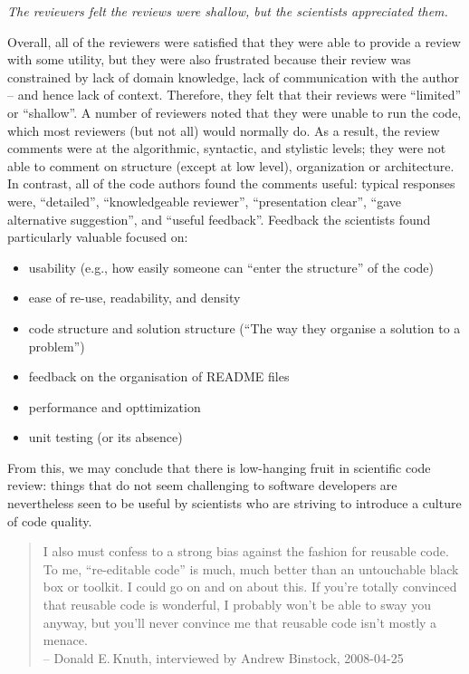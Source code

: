 \noindent
\emph{The reviewers felt the reviews were shallow, but the scientists appreciated them.}

Overall, all of the reviewers were satisfied that they were able to provide a review with some utility, but they were also frustrated because their review was constrained by lack of domain knowledge, lack of communication with the author – and hence lack of context. Therefore, they felt that their reviews were ``limited'' or ``shallow''. A number of reviewers noted that they were unable to run the code, which most reviewers (but not all) would normally do. As a result, the review comments were at the algorithmic, syntactic, and stylistic levels; they were not able to comment on structure (except at low level), organization or architecture.
In contrast, all of the code authors found the comments useful: typical responses were, ``detailed'', ``knowledgeable reviewer'', ``presentation clear'', ``gave alternative suggestion'', and ``useful feedback''. Feedback the scientists found particularly valuable focused on:
\begin{itemize}
\item usability (e.g., how easily someone can ``enter the structure'' of the code)
\item ease of re-use, readability, and density
\item code structure and solution structure (``The way they organise a solution to a problem'')
\item feedback on the organisation of README files
\item performance and opttimization
\item unit testing (or its absence)
\end{itemize}
From this, we may conclude that there is low-hanging fruit in scientific code review: things that do not seem challenging to software developers are nevertheless seen to be useful by scientists who are striving to introduce a culture of code quality.


\begin{quotation}
  \noindent
  I also must confess to a strong bias against the fashion for reusable code.
  To me, ``re-editable code'' is much, much better than an untouchable black box or toolkit.
  I could go on and on about this.
  If you're totally convinced that reusable code is wonderful,
  I probably won't be able to sway you anyway,
  but you'll never convince me that reusable code isn't mostly a menace.
  \\
  -- Donald E. Knuth, interviewed by Andrew Binstock, 2008-04-25
\end{quotation}
